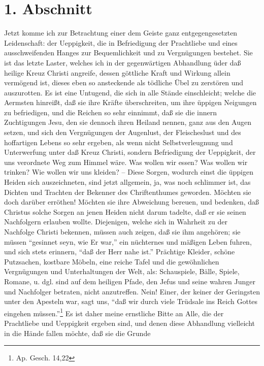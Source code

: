 \section{1. Abschnitt} \label{kap14_ab1}

Jetzt komme ich zur Betrachtung einer dem Geiste ganz entgegengesetzten
Leidenschaft: der Ueppigkeit, die in Befriedigung der Prachtliebe und eines
ausschweifenden Hanges zur Bequemlichkeit und zu Vergnügungen bestehet. Sie ist
das letzte Laster, welches ich in der gegenwärtigen Abhandlung üder daß heilige
Kreuz Christi angreife, dessen göttliche Kraft und Wirkung allein vermögend ist,
dieses eben so ansteckende als tödliche Übel zu zerstören und auszurotten. Es
ist eine Untugend, die sich in alle Stände einschleicht; welche die Aermsten
hinreißt, daß sie ihre Kräfte überschreiten, um ihre üppigen Neigungen zu
befriedigen, und die Reichen so sehr einnimmt, daß sie die innern Zuchtigungen
Jesu, den sie dennoch ihren Heiland nennen, ganz aus den Augen setzen, und sich
den Vergnügungen der Augenlust, der Fleischeslust und des hoffartigen Lebens so
sehr ergeben, als wenn nicht Selbstverleugnung und Unterwerfung unter daß Kreuz
Christi, sondern Befriedigung der Ueppigkeit, der uns verordnete Weg zum Himmel
wäre. Was wollen wir essen? Was wollen wir trinken? Wie wollen wir uns kleiden?
-- Diese Sorgen, wodurch einst die üppigen Heiden sich auszeichneten, sind jetzt
allgemein, ja, was noch schlimmer ist, das Dichten und Trachten der Bekenner des
Chriftenthumes geworden. Möchten sie doch darüber erröthen! Möchten sie ihre
Abweichung bereuen, und bedenken, daß Christus solche Sorgen an jenen Heiden
nicht darum tadelte, daß er sie seinen Nachfolgern erlauben wollte. Diejenigen,
welche sich in Wahrheit zu der Nachfolge Christi bekennen, müssen auch zeigen,
daß sie ihm angehören; sie müssen "`gesinnet seyn, wie Er war,"' ein nüchternes
und mäßigen Leben fuhren, und sich stets erinnern, "`daß der Herr nahe ist."'
Prächtige Kleider, schöne Putzsachen, kostbare Möbeln, eine reiche Tafel und die
gewöhnlichen Vergnügungen und Unterhaltungen der Welt, als: Schauspiele, Bälle,
Spiele, Romane, u. dgl. sind auf dem heiligen Pfade, den Jefus und seine wahren
Junger und Nachfolger betraten, nicht anzutreffen. Nein! Einer, der keiner der
Geringsten unter den Apesteln war, sagt uns, "`daß wir durch viele Trüdsale ins
Reich Gottes eingehen müssen."'\footnote{Ap. Gesch. 14,22} Es ist daher meine
ernstliche Bitte an Alle, die der Prachtliebe und Ueppigkeit ergeben sind, und
denen diese Abhandlung vielleicht in die Hände fallen möchte, daß sie die Grunde
